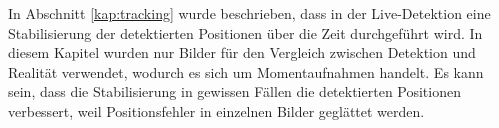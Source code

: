 In Abschnitt \ref{kap:tracking} wurde beschrieben, dass in der Live-Detektion eine Stabilisierung der detektierten Positionen
über die Zeit durchgeführt wird.
In diesem Kapitel wurden nur Bilder für den Vergleich zwischen Detektion und Realität verwendet, wodurch es sich um Momentaufnahmen handelt.
Es kann sein, dass die Stabilisierung in gewissen Fällen die detektierten Positionen verbessert,
weil Positionsfehler in einzelnen Bilder geglättet werden.
